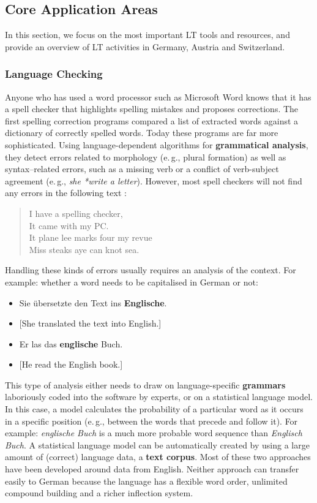 \documentclass[]{../../metanetpaper}
\begin{document}
\begin{multicols}{2}
\subsection{Core Application Areas}

In this section, we focus on the most important LT tools and resources, and provide an overview of LT activities in Germany, Austria and Switzerland. 

\subsubsection{Language Checking}

Anyone who has used a word processor such as Microsoft Word knows that it has a spell checker that highlights spelling mistakes and proposes corrections. The first spelling correction programs compared a list of extracted words against a dictionary of correctly spelled words. Today these programs are far more sophisticated. Using language-dependent algorithms for \textbf{grammatical analysis}, they detect errors related to morphology (e.\,g., plural formation) as well as syntax–related errors, such as a missing verb or a conflict of verb-subject agreement (e.\,g., \textit{she *write a letter}). However, most spell checkers will not find any errors in the following text \cite{zar1}:

\begin{quote}
  I have a spelling checker,\\
  It came with my PC.\\
  It plane lee marks four my revue\\
  Miss steaks aye can knot sea.
\end{quote}

Handling these kinds of errors usually requires an analysis of the context. For example: whether a word needs to be capitalised in German or not:

\begin{itemize}
\item Sie übersetzte den Text ins \textbf{Englische}.
\item {[}She translated the text into English.{]} 
\item Er las das \textbf{englische} Buch.
\item {[}He read the English book.{]}
\end{itemize}

This type of analysis either needs to draw on language-specific \textbf{grammars} laboriously coded into the software by experts, or on a statistical language model. In this case, a model calculates the probability of a particular word as it occurs in a specific position (e.\,g., between the words that precede and follow it). For example: \textit{englische Buch} is a much more probable word sequence than \textit{Englisch Buch}. A statistical language model can be automatically created by using a large amount of (correct) language data, a \textbf{text corpus}. Most of these two approaches have been developed around data from English. Neither approach can transfer easily to German because the language has a flexible word order, unlimited compound building and a richer inflection system.


\end{multicols}
\end{document}
